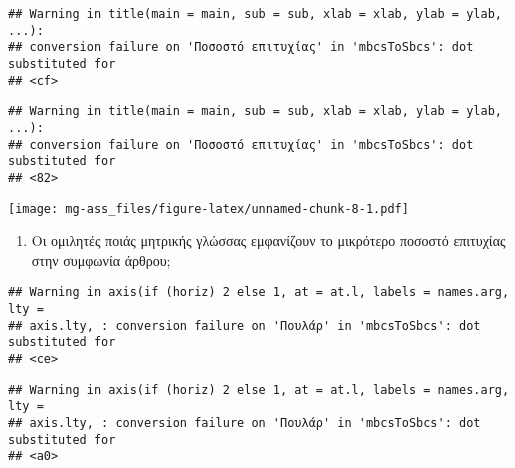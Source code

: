 \documentclass[
]{article}
\newenvironment{Shaded}{\begin{snugshade}}{\end{snugshade}}
\newcommand{\AttributeTok}[1]{\textcolor[rgb]{0.77,0.63,0.00}{#1}}
\newcommand{\ConstantTok}[1]{\textcolor[rgb]{0.00,0.00,0.00}{#1}}
\newcommand{\DecValTok}[1]{\textcolor[rgb]{0.00,0.00,0.81}{#1}}
\newcommand{\FunctionTok}[1]{\textcolor[rgb]{0.00,0.00,0.00}{#1}}
\newcommand{\NormalTok}[1]{#1}
\newcommand{\OtherTok}[1]{\textcolor[rgb]{0.56,0.35,0.01}{#1}}
\newcommand{\SpecialCharTok}[1]{\textcolor[rgb]{0.00,0.00,0.00}{#1}}
\newcommand{\StringTok}[1]{\textcolor[rgb]{0.31,0.60,0.02}{#1}}
\providecommand{\tightlist}{%
  \setlength{\itemsep}{0pt}\setlength{\parskip}{0pt}}
\begin{document}
\begin{verbatim}
## Warning in title(main = main, sub = sub, xlab = xlab, ylab = ylab, ...):
## conversion failure on 'Ποσοστό επιτυχίας' in 'mbcsToSbcs': dot substituted for
## <cf>
\end{verbatim}

\begin{verbatim}
## Warning in title(main = main, sub = sub, xlab = xlab, ylab = ylab, ...):
## conversion failure on 'Ποσοστό επιτυχίας' in 'mbcsToSbcs': dot substituted for
## <82>
\end{verbatim}

\texttt{[image: mg-ass\_files/figure-latex/unnamed-chunk-8-1.pdf]}

\begin{enumerate}
\def\labelenumi{\arabic{enumi})}
\setcounter{enumi}{1}
\tightlist
\item
  Οι ομιλητές ποιάς μητρικής γλώσσας εμφανίζουν το μικρότερο ποσοστό
  επιτυχίας στην συμφωνία άρθρου;
\end{enumerate}

\begin{Shaded}
\end{Shaded}

\begin{verbatim}
## Warning in axis(if (horiz) 2 else 1, at = at.l, labels = names.arg, lty =
## axis.lty, : conversion failure on 'Πουλάρ' in 'mbcsToSbcs': dot substituted for
## <ce>
\end{verbatim}

\begin{verbatim}
## Warning in axis(if (horiz) 2 else 1, at = at.l, labels = names.arg, lty =
## axis.lty, : conversion failure on 'Πουλάρ' in 'mbcsToSbcs': dot substituted for
## <a0>
\end{verbatim}
\end{document}
